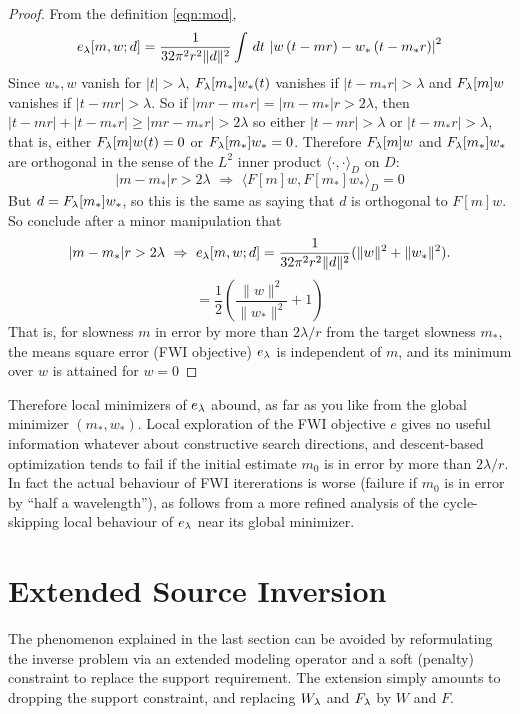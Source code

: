 \begin{proof} From the definition \ref{eqn:mod},
\[
 e_{\lambda}[m,w;d] =  \frac{1}{32\pi^2
    r^2\|d\|^2}\int\,dt\,\left|w\left(t-mr\right)-w_*\left(t-m_*r\right)\right|^2
\]
Since $w_*, w$ vanish for $|t|>\lambda$,
$F_{\lambda}[m_*]w_*(t)$ vanishes if $|t-m_*r|>\lambda$ and $F_{\lambda}[m]w$ vanishes if $|t-mr|>\lambda$. So if $|mr-m_*r|
= |m-m_*|r > 2\lambda$, then $|t-mr|+|t-m_*r| \ge |mr-m_*r| >
2\lambda$ so either $|t-mr|>\lambda$ or $|t-m_*r|>\lambda$, that is,
either $F_{\lambda}[m]w(t)=0$ or $F_{\lambda}[m_*]w_*=0$. Therefore $F_{\lambda}[m]w$ and
$F_{\lambda}[m_*]w_*$ are orthogonal in the sense of the $L^2$ inner product
$\langle \cdot,\cdot \rangle_D$ on $D$:
\begin{equation}
  \label{eqn:ortho}
  |m- m_*|r > 2\lambda \,\, \Rightarrow \,\, \langle F[m]w,
  F[m_*]w_*\rangle_D = 0
\end{equation}
But $d = F_{\lambda}[m_*]w_*$, so this is the same as saying that $d$ is
orthogonal to $F[m]w$. So conclude after a minor manipulation that
\[
  |m- m_*|r > 2\lambda \,\, \Rightarrow \,\, e_{\lambda}[m,w;d]=\frac{1}{32\pi^2 
    r^2\|d\|^2}(\|w\|^2 + \|w_*\|^2).
\]
\begin{equation}
  \label{eqn:iso}
  = \frac{1}{2}\left(\frac{\|w\|^2}{\|w_*\|^2} + 1 \right)
\end{equation}
That is, for slowness $m$ in error by more than $2\lambda/r$ from the 
target slowness $m_*$, the means square error (FWI objective) $e_{\lambda}$ is independent of
$m$, and its minimum over $w$ is attained for $w=0$
\end{proof}

Therefore local minimizers of $e_{\lambda}$ abound, as far as you like from the
global minimizer $(m_*,w_*)$. Local exploration of the FWI objective
$e$ gives no useful information whatever about constructive search
directions, and descent-based optimization tends to fail if the
initial estimate $m_0$ is in error by more than $2\lambda/r$. In fact the actual behaviour of FWI itererations is worse
(failure if $m_0$ is in error by ``half a wavelength''), as follows
from a more refined analysis of the cycle-skipping local behaviour of $e_{\lambda}$ near its
global minimizer.

\section{Extended Source Inversion}
The phenomenon explained in the last section can be avoided by
reformulating the inverse problem via an extended modeling operator
and a soft (penalty) constraint to replace the support
requirement. The extension simply amounts to dropping the support
constraint, and replacing $W_{\lambda}$ and $F_{\lambda}$ by $W$ and $F$.


